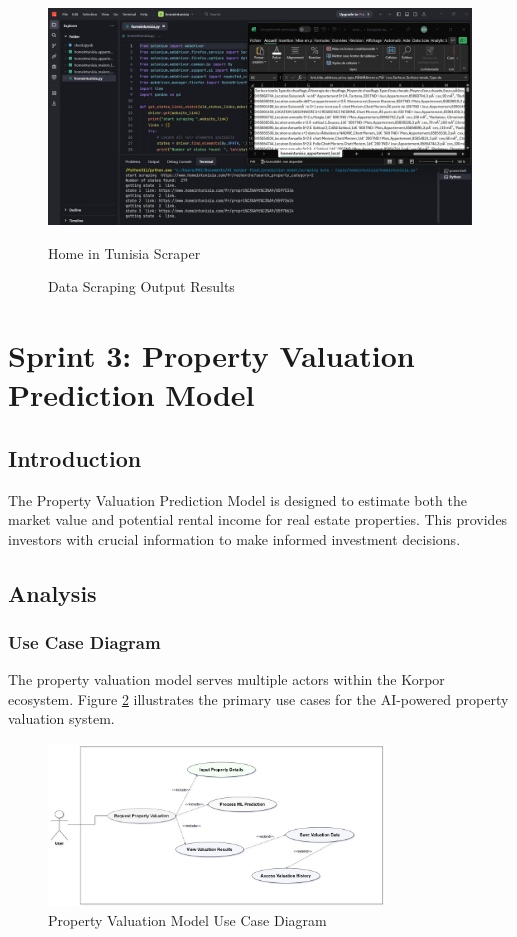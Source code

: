 \begin{figure}[htbp]
    \begin{minipage}{0.45\textwidth}
        \centering
        \includegraphics[width=\linewidth]{images/home_in_tunisia_scraper.jpeg}
        \caption*{Home in Tunisia Scraper}
    \end{minipage}
    \caption{Data Scraping Output Results}
    \label{fig:scraping-output}
\end{figure}

\section{Sprint 3: Property Valuation Prediction Model}

\subsection*{Introduction}
The Property Valuation Prediction Model is designed to estimate both the market value and potential rental income for real estate properties. This provides investors with crucial information to make informed investment decisions.

\subsection{Analysis}
\subsubsection{Use Case Diagram}
The property valuation model serves multiple actors within the Korpor ecosystem. Figure \ref{fig:valuation-use-case} illustrates the primary use cases for the AI-powered property valuation system.

\begin{figure}[htbp]
    \centering
    \includegraphics[width=0.8\textwidth]{images/valuation_use_case_diagram.png}
    \caption{Property Valuation Model Use Case Diagram}
    \label{fig:valuation-use-case}
\end{figure}

